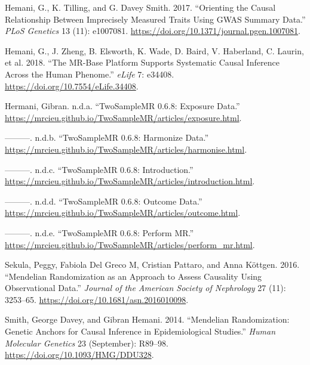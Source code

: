 \documentclass[
]{article}
\newlength{\cslhangindent}
\newenvironment{CSLReferences}[2] %
 {\begin{list}{}{%
  \setlength{\itemindent}{0pt}
  \setlength{\leftmargin}{0pt}
  \setlength{\parsep}{0pt}
  \ifodd #1
   \setlength{\leftmargin}{\cslhangindent}
   \setlength{\itemindent}{-1\cslhangindent}
  \fi
  \setlength{\itemsep}{#2\baselineskip}}}
 {\end{list}}
\begin{document}
\begin{CSLReferences}{1}{0}
Hemani, G., K. Tilling, and G. Davey Smith. 2017. {``Orienting the
Causal Relationship Between Imprecisely Measured Traits Using GWAS
Summary Data.''} \emph{PLoS Genetics} 13 (11): e1007081.
\url{https://doi.org/10.1371/journal.pgen.1007081}.

Hemani, G., J. Zheng, B. Elsworth, K. Wade, D. Baird, V. Haberland, C.
Laurin, et al. 2018. {``The MR-Base Platform Supports Systematic Causal
Inference Across the Human Phenome.''} \emph{eLife} 7: e34408.
\url{https://doi.org/10.7554/eLife.34408}.

Hermani, Gibran. n.d.a. {``TwoSampleMR 0.6.8: Exposure Data.''}
\url{https://mrcieu.github.io/TwoSampleMR/articles/exposure.html}.

---------. n.d.b. {``TwoSampleMR 0.6.8: Harmonize Data.''}
\url{https://mrcieu.github.io/TwoSampleMR/articles/harmonise.html}.

---------. n.d.c. {``TwoSampleMR 0.6.8: Introduction.''}
\url{https://mrcieu.github.io/TwoSampleMR/articles/introduction.html}.

---------. n.d.d. {``TwoSampleMR 0.6.8: Outcome Data.''}
\url{https://mrcieu.github.io/TwoSampleMR/articles/outcome.html}.

---------. n.d.e. {``TwoSampleMR 0.6.8: Perform MR.''}
\url{https://mrcieu.github.io/TwoSampleMR/articles/perform_mr.html}.

Sekula, Peggy, Fabiola Del Greco M, Cristian Pattaro, and Anna Köttgen.
2016. {``Mendelian Randomization as an Approach to Assess Causality
Using Observational Data.''} \emph{Journal of the American Society of
Nephrology} 27 (11): 3253--65.
\url{https://doi.org/10.1681/asn.2016010098}.

Smith, George Davey, and Gibran Hemani. 2014. {``Mendelian
Randomization: Genetic Anchors for Causal Inference in Epidemiological
Studies.''} \emph{Human Molecular Genetics} 23 (September): R89--98.
\url{https://doi.org/10.1093/HMG/DDU328}.

\end{CSLReferences}
\end{document}
